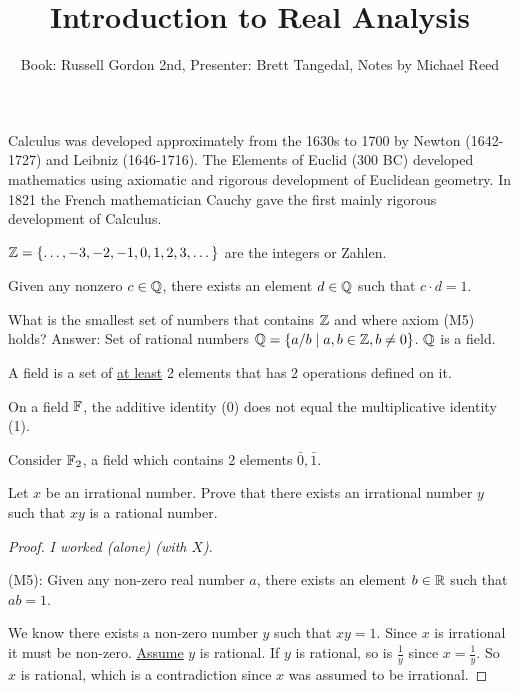 \documentclass[]{article}
\author{Book: Russell Gordon 2nd, Presenter: Brett Tangedal, Notes by Michael Reed}
\title{Introduction to Real Analysis}
\begin{document}
\maketitle

Calculus was developed approximately from the 1630s to 1700 by Newton (1642-1727) and Leibniz (1646-1716). The Elements of Euclid (300 BC) developed mathematics using axiomatic and rigorous development of Euclidean geometry. In 1821 the French mathematician Cauchy gave the first mainly rigorous development of Calculus.
\begin{example}
	$\mathbb{Z} =\{\dots,-3,-2,-1,0,1,2,3,\dots\}$ are the integers or Zahlen.
\end{example}

\begin{proposition}
	[M5] Given any nonzero $c\in \mathbb{Q}$, there exists an element $d\in\mathbb{Q}$ such that $c\cdot d=1$.
\end{proposition}

\begin{example}
	What is the smallest set of numbers that contains $\mathbb{Z}$ and where axiom (M5) holds? Answer: Set of rational numbers $\mathbb{Q} = \{a/b\mid a,b\in\mathbb{Z},b\neq0\}$. $\mathbb{Q}$ is a field.
\end{example}

\begin{definition}
	A field is a set of \ul{at least} 2 elements that has 2 operations defined on it.
\end{definition}

On a field $\mathbb{F}$, the additive identity (0) does not equal the multiplicative identity (1).

\begin{example}
	Consider $\mathbb{F}_2$, a field which contains 2 elements $\bar 0,\bar 1$.
\end{example}

\begin{example}
	[HW Example (9) on p.9] Let $x$ be an irrational number. Prove that there exists an irrational number $y$ such that $xy$ is a rational number.
	\begin{proof}
		\textit{I worked (alone) (with $X$)}.
		
		(M5): Given any non-zero real number $a$, there exists an element $b\in\mathbb{R}$ such that $ab=1$.
		
		We know there exists a non-zero number $y$ such that $xy=1$. Since $x$ is irrational it must be non-zero. \ul{Assume} $y$ is rational. If $y$ is rational, so is $\frac{1}{y}$ since $x=\frac{1}{y}$. So $x$ is rational, which is a contradiction since $x$ was assumed to be irrational.
	\end{proof}
\end{example}
\end{document}
